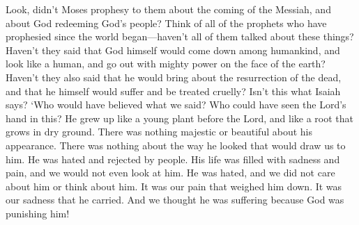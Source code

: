 \bverse \iffalse For behold, did not Moses prophesy unto them concerning the coming of the Messiah, and that God should redeem his people?  Yea, and even all the prophets who have prophesied ever since the world began--have they not spoken more or less concerning these things? \fi
Look, didn't Moses prophesy to them about the coming of the Messiah, and about God redeeming God's people? Think of all of the prophets who have prophesied since the world began---haven't all of them talked about these things?
\bverse \iffalse Have they not said that God himself should come down among the children of men, and take upon him the form of man, and go forth in mighty power upon the face of the earth? \fi
Haven't they said that God himself would come down among humankind, and look like a human, and go out with mighty power on the face of the earth? 
\bverse \iffalse Yea, and have they not said also that he should bring to pass the resurrection of the dead, and that he, himself, should be oppressed and afflicted? \fi
Haven't they also said that he would bring about the resurrection of the dead, and that he himself would suffer and be treated cruelly?
\bchapter
\bverse \iffalse Yea, even doth not Isaiah say: Who hath believed our report, and to whom is the arm of the Lord revealed? \fi
Isn't this what Isaiah says? \lq Who would have believed what we said? Who could have seen the Lord's hand in this?
\bverse \iffalse For he shall grow up before him as a tender plant, and as a root out of dry ground; he hath no form nor comeliness; and when we shall see him there is no beauty that we should desire him. \fi
He grew up like a young plant before the Lord, and like a root that grows in dry ground. There was nothing majestic or beautiful about his appearance. There was nothing about the way he looked that would draw us to him.
\bverse \iffalse He is despised and rejected of men; a man of sorrows, and acquainted with grief; and we hid as it were our faces from him; he was despised, and we esteemed him not. \fi
He was hated and rejected by people. His life was filled with sadness and pain, and we would not even look at him. He was hated, and we did not care about him or think about him.
\bverse \iffalse Surely he has borne our griefs, and carried our sorrows; yet we did esteem him stricken, smitten of God, and afflicted. \fi
It was our pain that weighed him down. It was our sadness that he carried. And we thought he was suffering because God was punishing him!
